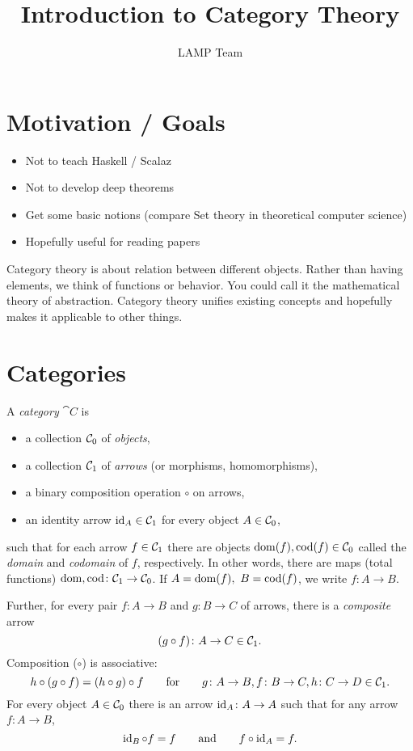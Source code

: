 \documentclass{scrartcl}
\newenvironment{category}{\begin{itemize}[leftmargin=.9in]}{\end{itemize}}
\newcommand{\catobj}[1]{\item[\textbf{Objects}] #1}
\newcommand{\catarr}[1]{\item[\textbf{Arrows}] #1}
\newcommand{\catcomp}[1]{\item[\textbf{Comp.}] #1}
\newcommand{\catid}[1]{\item[\textbf{Identity}] #1}
\begin{document}
\title{Introduction to Category Theory}
\date{}
\author{LAMP Team}

\maketitle

\section{Motivation / Goals}

\begin{itemize}
\item Not to teach Haskell / Scalaz
\item Not to develop deep theorems
\item Get some basic notions (compare Set theory in theoretical
  computer science)
\item Hopefully useful for reading papers
\end{itemize}

Category theory is about relation between different objects. Rather
than having elements, we think of functions or behavior. You could
call it the mathematical theory of abstraction. Category theory
unifies existing concepts and hopefully makes it applicable to other
things.

\section{Categories}

\begin{definition}[Category]
  A \emph{category} $\cat{C}$ is
  \begin{category}
    \catobj{a collection $\mathcal{C}_{0}$ of \emph{objects},}
    \catarr{a collection $\mathcal{C}_{1}$ of \emph{arrows} (or
      morphisms, homomorphisms),}
    \catcomp{a binary composition operation $\circ$ on arrows,}
    \catid{an identity arrow $\operatorname{id}_A \in \mathcal{C}_{1}$ for every
      object $A \in \mathcal{C}_{0}$,}
  \end{category}
  such that for each arrow $f \in \mathcal{C}_{1}$ there are objects
  $\operatorname*{dom}(f), \operatorname*{cod}(f) \in \mathcal{C}_{0}$ called the \emph{domain} and
  \emph{codomain} of $f$, respectively.  In other words, there are
  maps (total functions) $\dom, \cod \colon \arrs{\cat{C}} \to
  \obs{\cat{C}}$.  If $A = \operatorname*{dom}(f),\ B = \operatorname*{cod}(f)$, we write $f \colon
  A \to B$.

  Further, for every pair $f \colon A \to B$ and $g \colon B \to C$ of
  arrows, there is a \emph{composite} arrow
  \[ (g \circ f) \colon A \to C \in \arrs{\cat{C}}. \]
  Composition ($\circ$) is associative:
  \[
  h \circ (g \circ f) = (h \circ g) \circ f \qquad \text{for} \qquad g
  \colon A \to B, f \colon B \to C, h \colon C \to D \in
  \arrs{\cat{C}}.
  \]
  For every object $A \in \mathcal{C}_{0}$ there is an arrow $\id_A
  \colon A \to A$ such that for any arrow $f \colon A \to B$,
  \[
  \operatorname{id}_B \circ f = f \qquad \text{and} \qquad f \circ \operatorname{id}_A = f.
  \]
\end{definition}
\end{document}
